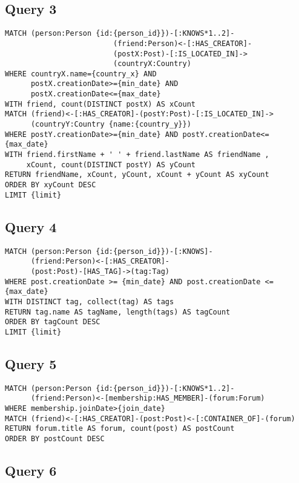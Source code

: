 \subsection{Query 3}

\begin{verbatim}
MATCH (person:Person {id:{person_id}})-[:KNOWS*1..2]-
                         (friend:Person)<-[:HAS_CREATOR]-
                         (postX:Post)-[:IS_LOCATED_IN]->
                         (countryX:Country)
WHERE countryX.name={country_x} AND 
      postX.creationDate>={min_date} AND
      postX.creationDate<={max_date}
WITH friend, count(DISTINCT postX) AS xCount
MATCH (friend)<-[:HAS_CREATOR]-(postY:Post)-[:IS_LOCATED_IN]->
      (countryY:Country {name:{country_y}})
WHERE postY.creationDate>={min_date} AND postY.creationDate<={max_date}
WITH friend.firstName + ' ' + friend.lastName AS friendName ,
     xCount, count(DISTINCT postY) AS yCount
RETURN friendName, xCount, yCount, xCount + yCount AS xyCount
ORDER BY xyCount DESC
LIMIT {limit}
\end{verbatim}

\subsection{Query 4}

\begin{verbatim}
MATCH (person:Person {id:{person_id}})-[:KNOWS]-
      (friend:Person)<-[:HAS_CREATOR]-
      (post:Post)-[HAS_TAG]->(tag:Tag)
WHERE post.creationDate >= {min_date} AND post.creationDate <= {max_date}
WITH DISTINCT tag, collect(tag) AS tags
RETURN tag.name AS tagName, length(tags) AS tagCount
ORDER BY tagCount DESC
LIMIT {limit}
\end{verbatim}

\subsection{Query 5}

\begin{verbatim}
MATCH (person:Person {id:{person_id}})-[:KNOWS*1..2]-
      (friend:Person)<-[membership:HAS_MEMBER]-(forum:Forum)
WHERE membership.joinDate>{join_date}
MATCH (friend)<-[:HAS_CREATOR]-(post:Post)<-[:CONTAINER_OF]-(forum)
RETURN forum.title AS forum, count(post) AS postCount
ORDER BY postCount DESC
\end{verbatim}

\subsection{Query 6}

